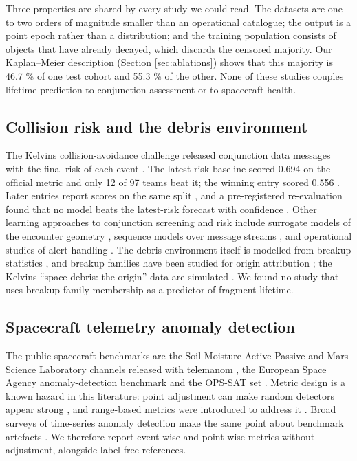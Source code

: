 \documentclass[3p,times,twocolumn]{elsarticle}
\begin{document}
Three properties are shared by every study we could read. The datasets
are one to two orders of magnitude smaller than an operational
catalogue; the output is a point epoch rather than a distribution; and
the training population consists of objects that have already decayed,
which discards the censored majority. Our Kaplan--Meier description
(Section \ref{sec:ablations}) shows that this majority is 46.7 \% of one
test cohort and 55.3 \% of the other. None of these studies couples
lifetime prediction to conjunction assessment or to spacecraft health.

\subsection{Collision risk and the debris
environment}\label{collision-risk-and-the-debris-environment}

The Kelvins collision-avoidance challenge released conjunction data
messages with the final risk of each event
\citep{uriot2021cacdataset, uriot2022spacecraft}. The latest-risk
baseline scored 0.694 on the official metric and only 12 of 97 teams
beat it; the winning entry scored 0.556 \citep{uriot2022spacecraft}.
Later entries report scores on the same split
\citep{tulczyjew2021predicting}, and a pre-registered re-evaluation
found that no model beats the latest-risk forecast with confidence
\citep{vazquez2026latest}. Other learning approaches to conjunction
screening and risk include surrogate models of the encounter geometry
\citep{acciarini2021kessler, acciarini2024improving}, sequence models
over message streams \citep{chu2024conjunction, chu2026conjunction}, and
operational studies of alert handling
\citep{stevenson2022towards, lidtke2019optimising}. The debris
environment itself is modelled from breakup statistics
\citep{johnson2001nasa, kessler1978collision}, and breakup families have
been studied for origin attribution
\citep{wu2023investigation, celletti2021reconnecting}; the Kelvins
``space debris: the origin'' data are simulated
\citep{efthymiopoulos2021origin, esa2021kelvinsorigin}. We found no
study that uses breakup-family membership as a predictor of fragment
lifetime.

\subsection{Spacecraft telemetry anomaly
detection}\label{spacecraft-telemetry-anomaly-detection}

The public spacecraft benchmarks are the Soil Moisture Active Passive
and Mars Science Laboratory channels released with telemanom
\citep{hundman2018}, the European Space Agency anomaly-detection
benchmark \citep{kotowski2026esaadb, esaadb_dataset} and the OPS-SAT set
\citep{ruszczak2025opssat}. Metric design is a known hazard in this
literature: point adjustment can make random detectors appear strong
\citep{kim2022rigorous, wu2021flawed}, and range-based metrics were
introduced to address it \citep{tatbul2018precision}. Broad surveys of
time-series anomaly detection make the same point about benchmark
artefacts
\citep{schmidl2022anomaly, paparrizos2022tsbuad, sehili2023flawed}. We
therefore report event-wise and point-wise metrics without adjustment,
alongside label-free references.
\end{document}
